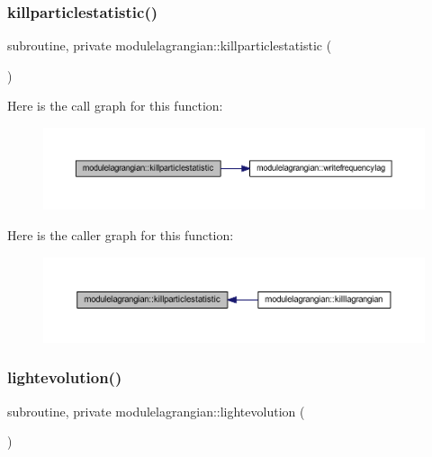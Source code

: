 \subsubsection{\texorpdfstring{killparticlestatistic()}{killparticlestatistic()}}
{\footnotesize\ttfamily subroutine, private modulelagrangian\+::killparticlestatistic (\begin{DoxyParamCaption}{ }\end{DoxyParamCaption})\hspace{0.3cm}{\ttfamily [private]}}

Here is the call graph for this function\+:\nopagebreak
\begin{figure}[H]
\begin{center}
\leavevmode
\includegraphics[width=350pt]{namespacemodulelagrangian_acabd7df16f5abd0459a4a8e198526f3d_cgraph}
\end{center}
\end{figure}
Here is the caller graph for this function\+:\nopagebreak
\begin{figure}[H]
\begin{center}
\leavevmode
\includegraphics[width=350pt]{namespacemodulelagrangian_acabd7df16f5abd0459a4a8e198526f3d_icgraph}
\end{center}
\end{figure}
\mbox{\label{namespacemodulelagrangian_aba461e3f5d94c00b11072bae66f32060}} 
\subsubsection{\texorpdfstring{lightevolution()}{lightevolution()}}
{\footnotesize\ttfamily subroutine, private modulelagrangian\+::lightevolution (\begin{DoxyParamCaption}{ }\end{DoxyParamCaption})\hspace{0.3cm}{\ttfamily [private]}}

